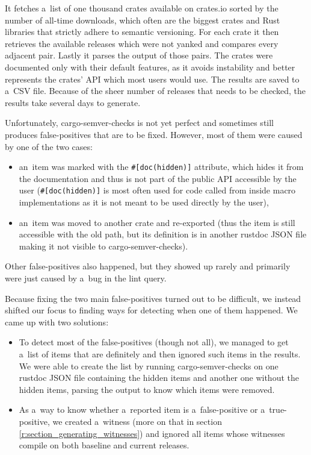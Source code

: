 \documentclass[licencjacka,en]{pracamgr}
\begin{document}
It fetches a~list of one thousand crates available on crates.io sorted by the number of
all-time downloads, which often are the biggest crates and Rust libraries
that strictly adhere to semantic versioning. For each crate
it then retrieves the available releases which were not yanked
and compares every adjacent pair. Lastly it parses the
output of those pairs. The crates were documented only with their
default features, as it avoids instability and better represents the crates'
API which most users would use.
The results are saved to a~CSV file.
Because of the sheer number of releases that needs to be checked, the results take several days
to generate.

Unfortunately, cargo-semver-checks is not yet perfect and sometimes still produces false-positives
that are to be fixed. However, most of them were caused by one of the two cases:
\begin{itemize}
	\item an~item was marked with the \texttt{\#[doc(hidden)]} attribute,
		which hides it from the documentation and thus is not part
		of the public API accessible by the user
		(\texttt{\#[doc(hidden)]} is most often used for code called from inside macro
		implementations as it is not meant to be used directly by the user),
	\item an~item was moved to another crate and re-exported
		(thus the item is still accessible with the old path,
		but its definition is in another rustdoc JSON file making it not visible
		to cargo-semver-checks).
\end{itemize}
Other false-positives also happened, but they showed up rarely and primarily
were just caused by a~bug in the lint query.

Because fixing the two main false-positives turned out to be difficult, we instead shifted
our focus to finding ways for detecting when one of them happened.
We came up with two solutions:
\begin{itemize}
	\item To detect most of the  false-positives
		(though not all), we managed to get a~list of items that are definitely
		 and then ignored such items in the results.
		We were able to create the list by running cargo-semver-checks on one rustdoc JSON file
		containing the hidden items and another one without the hidden items,
		parsing the output to know which items were removed.
	\item As a~way to know whether a~reported item is a~false-positive or a~true-positive,
		we created a~witness (more on that in section \ref{r:section_generating_witnesses})
		and ignored all items whose witnesses compile on both baseline and current releases.
\end{itemize}
\end{document}

